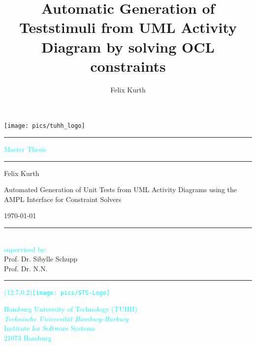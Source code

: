 \documentclass[twoside, english,numbers=noenddot, abstracton, headsepline, openright]{scrreprt}
\author{Felix Kurth}
\title{Automatic Generation of Teststimuli from UML Activity Diagram by solving OCL constraints}
\begin{document}
\titlepage

\setlength{\parskip}{1pt}

\noindent \begin{flushright}
\texttt{[image: pics/tuhh\_logo]}
\par\end{flushright}

\textcolor{cyan}{\rule[0.5ex]{1\columnwidth}{0.5pt}}

\textsf{\textcolor{cyan}{\Large Master Thesis}}{\Large \par}

\textcolor{cyan}{\rule[0.5ex]{1\columnwidth}{0.5pt}}

\vspace{32mm}


\noindent \begin{flushright}
\textsf{\Large  Felix Kurth}\textsf{\textbf{\Large }}\\
\textsf{\vspace{1.2cm}
}
\par\end{flushright}

\noindent \begin{flushright}
\textsf{\huge Automated Generation of Unit Tests from UML Activity Diagrams using the AMPL Interface for Constraint Solvers}\\
\par\end{flushright}{\huge \par}

\vspace{45mm}


\noindent \begin{flushright}
\textsf{\Large \today}
\par\end{flushright}{\Large \par}

\noindent \begin{flushleft}
\textsf{\vspace{16mm}
}\textcolor{cyan}{\rule[0.5ex]{1\columnwidth}{0.5pt}}\\
\textsf{\textcolor{cyan}{\large supervised by:}}\textsf{}\\
\textsf{Prof. Dr. Sibylle Schupp}\\
\textsf{Prof. Dr. N.N.}\textcolor{cyan}{}\\
\textcolor{cyan}{\rule[0.5ex]{1\columnwidth}{0.5pt}\begin{textblock}{3}(12.7,0.2)\texttt{[image: pics/STS-Logo]}\end{textblock}}\textsf{\textcolor{cyan}{Hamburg University of Technology (TUHH)}}\\
\textsf{\textcolor{cyan}{\textit{Technische Universit{\"a}t Hamburg-Harburg}}}\\
\textsf{\textcolor{cyan}{Institute for Software Systems}}\\
\textsf{\textcolor{cyan}{21073 Hamburg}}
\par\end{flushleft}
\end{document}
